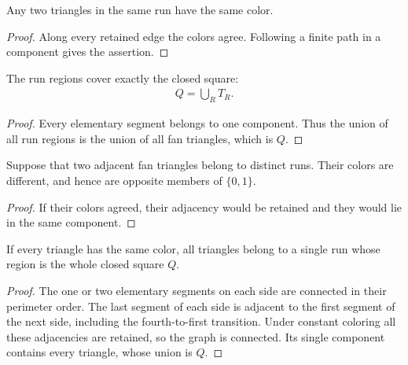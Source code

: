 \begin{lemma}
    \label{thm:area_law_fan_run_color}
    \leanok
    Any two triangles in the same run have the same color.
\end{lemma}
\begin{proof}\leanok
    Along every retained edge the colors agree. Following a finite
    path in a component gives the assertion.
\end{proof}

\begin{lemma}
    \label{thm:area_law_fan_run_cover}
    \leanok
    The run regions cover exactly the closed square:
    \begin{align}
        Q=\bigcup_R T_R.
    \end{align}
\end{lemma}
\begin{proof}\leanok
    Every elementary segment belongs to one component. Thus the
    union of all run regions is the union of all fan triangles, which
    is $Q$.
\end{proof}

\begin{lemma}
    \label{thm:area_law_fan_run_opposite}
    \leanok
    Suppose that two adjacent fan triangles belong to distinct runs.
    Their colors are different, and hence are opposite members of
    $\{0,1\}$.
\end{lemma}
\begin{proof}\leanok
    If their colors agreed, their adjacency would be retained and
    they would lie in the same component.
\end{proof}

\begin{lemma}
    \label{thm:area_law_fan_run_monochromatic}
    \leanok
    If every triangle has the same color, all triangles belong to a single
    run whose region is the whole closed square $Q$.
\end{lemma}
\begin{proof}\leanok
    The one or two elementary segments on each side are connected
    in their perimeter order. The last segment of each side is
    adjacent to the first segment of the next side, including the
    fourth-to-first transition. Under constant coloring all these
    adjacencies are retained, so the graph is connected. Its single
    component contains every triangle, whose union is $Q$.
\end{proof}
